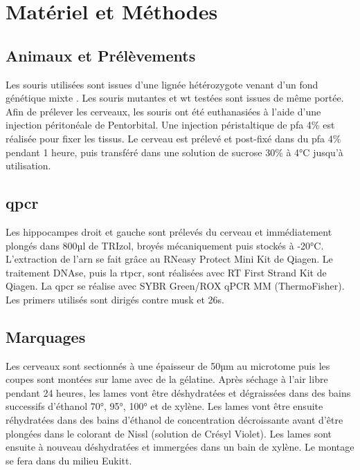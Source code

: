 \chapter{Matériel et Méthodes}

\section{Animaux et Prélèvements}
\label{sec:AnimEtPrelev}
	Les souris utilisées sont issues d'une lignée hétérozygote venant d'un fond génétique mixte \cite{Messeant2015, Messeant2017}. Les souris mutantes \mcrd et \gls{wt} testées sont issues de même portée. Afin de prélever les cerveaux, les souris ont été euthanasiées à l'aide d'une injection péritonéale de Pentorbital. Une injection péristaltique de \gls{pfa} 4\% est réalisée pour fixer les tissus. Le cerveau est prélevé et post-fixé dans du \gls{pfa} 4\% pendant 1 heure, puis transféré dans une solution de sucrose 30\% à 4°C jusqu'à utilisation.
	
\section{\acrshort{qpcr}}
\label{sec:qPCR}
	Les hippocampes droit et gauche sont prélevés du cerveau et immédiatement plongés dans 800µl de TRIzol\textregistered, broyés mécaniquement puis stockés à -20°C. L'extraction de l'\acrshort{arn} se fait grâce au RNeasy Protect Mini Kit de Qiagen\textregistered. Le traitement DNAse, puis la \gls{rtpcr}, sont réalisées avec RT First Strand Kit de Qiagen\textregistered. La \gls{qpcr} se réalise avec SYBR Green/ROX qPCR MM (ThermoFisher\textregistered). Les primers utilisés sont dirigés contre \gls{musk} et \acrshort{26s}.
	
\section{Marquages}
\label{sec:Marquages}
	Les cerveaux sont sectionnés à une épaisseur de 50µm au microtome puis les coupes sont montées sur lame avec de la gélatine. Après séchage à l'air libre pendant 24 heures, les lames vont être déshydratées et dégraissées dans des bains successifs d'éthanol 70°, 95°, 100° et de xylène. Les lames vont être ensuite réhydratées dans des bains d'éthanol de concentration décroissante avant d'être plongées dans le colorant de Nissl (solution de Crésyl Violet).  Les lames sont ensuite  à nouveau déshydratées et immergées dans un bain de xylène. Le montage se fera dans du milieu Eukitt\textregistered.
	
